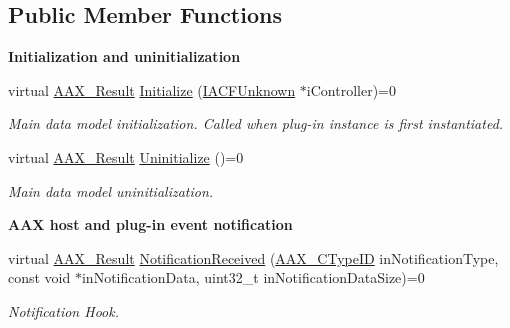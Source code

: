 \subsection*{Public Member Functions}
\begin{Indent}\textbf{ Initialization and uninitialization}\par
\begin{DoxyCompactItemize}
\item 
virtual \mbox{\hyperlink{a00392_a4d8f69a697df7f70c3a8e9b8ee130d2f}{A\+A\+X\+\_\+\+Result}} \mbox{\hyperlink{a01669_ad4db3c0ab67f8f41cdd042a915daabb4}{Initialize}} (\mbox{\hyperlink{a01409}{I\+A\+C\+F\+Unknown}} $\ast$i\+Controller)=0
\begin{DoxyCompactList}\small\item\em Main data model initialization. Called when plug-\/in instance is first instantiated. \end{DoxyCompactList}\item 
virtual \mbox{\hyperlink{a00392_a4d8f69a697df7f70c3a8e9b8ee130d2f}{A\+A\+X\+\_\+\+Result}} \mbox{\hyperlink{a01669_a711969adc95624fb9ac8a3e3b2c23696}{Uninitialize}} ()=0
\begin{DoxyCompactList}\small\item\em Main data model uninitialization. \end{DoxyCompactList}\end{DoxyCompactItemize}
\end{Indent}
\begin{Indent}\textbf{ A\+AX host and plug-\/in event notification}\par
\begin{DoxyCompactItemize}
\item 
virtual \mbox{\hyperlink{a00392_a4d8f69a697df7f70c3a8e9b8ee130d2f}{A\+A\+X\+\_\+\+Result}} \mbox{\hyperlink{a01669_aa3eaeb292d2ca84086a5a058171994fd}{Notification\+Received}} (\mbox{\hyperlink{a00392_ac678f9c1fbcc26315d209f71a147a175}{A\+A\+X\+\_\+\+C\+Type\+ID}} in\+Notification\+Type, const void $\ast$in\+Notification\+Data, uint32\+\_\+t in\+Notification\+Data\+Size)=0
\begin{DoxyCompactList}\small\item\em Notification Hook. \end{DoxyCompactList}\end{DoxyCompactItemize}
\end{Indent}
